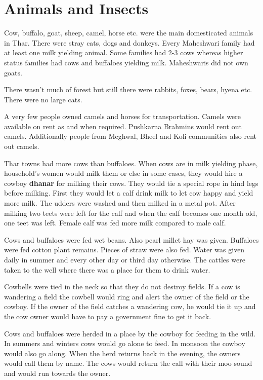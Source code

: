\chapter{Animals and Insects}
Cow, buffalo, goat, sheep, camel, horse etc. were the main domesticated animals
in Thar. There were stray cats, dogs and donkeys. Every Maheshwari family had
at least one milk yielding animal. Some families had 2-3 cows whereas higher
status families had cows and buffaloes yielding milk. Maheshwaris did not own
goats.

There wasn't much of forest but still there were rabbits, foxes, bears, hyena
etc. There were no large cats.

A very few people owned camels and horses for transportation. Camels were
available on rent as and when required. Pushkarna Brahmins would rent out
camels. Additionally people from Meghwal, Bheel and Koli communities also rent
out camels.

Thar towns had more cows than buffaloes. When cows are in milk yielding phase,
household's women would milk them or else in some cases, they would hire a
cowboy \textbf{dhanar} for milking their cows. They would tie a special rope in
hind legs before milking. First they would let a calf drink milk to let cow
happy and yield more milk. The udders were washed and then milked in a metal
pot. After milking two teets were left for the calf and when the calf becomes
one month old, one teet was left. Female calf was fed more milk compared to
male calf.

Cows and buffaloes were fed wet beans. Also pearl millet hay was given.
Buffaloes were fed cotton plant remains. Pieces of straw were also fed. Water
was given daily in summer and every other day or third day otherwise. The
cattles were taken to the well where there was a place for them to drink water.

Cowbells were tied in the neck so that they do not destroy fields. If a cow is
wandering a field the cowbell would ring and alert the owner of the field or
the cowboy. If the owner of the field catches a wandering cow, he would tie it
up and the cow owner would have to pay a government fine to get it back.

Cows and buffaloes were herded in a place by the cowboy for feeding in the
wild. In summers and winters cows would go alone to feed. In monsoon the cowboy
would also go along. When the herd returns back in the evening, the owners
would call them by name. The cows would return the call with their moo sound
and would run towards the owner.

